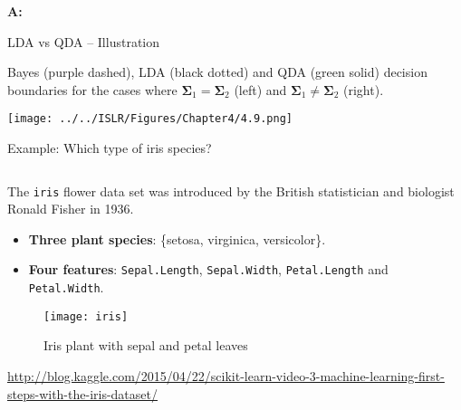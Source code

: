 \documentclass[10pt,ignorenonframetext,]{beamer}
\providecommand{\tightlist}{%
  \setlength{\itemsep}{0pt}\setlength{\parskip}{0pt}}
\begin{document}
\begin{frame}

\textbf{A:}

\vspace{50mm}

\end{frame}

\begin{frame}

\begin{block}{LDA vs QDA -- Illustration}

\vspace{1mm}

Bayes (purple dashed), LDA (black dotted) and QDA (green solid) decision
boundaries for the cases where
\(\boldsymbol{\Sigma}_1 = \boldsymbol{\Sigma}_2\) (left) and
\(\boldsymbol{\Sigma}_1 \neq \boldsymbol{\Sigma}_2\) (right).

\centering

\texttt{[image: ../../ISLR/Figures/Chapter4/4.9.png]}

\end{block}

\end{frame}

\begin{frame}[fragile]

\begin{block}{Example: Which type of iris species?}

\(~\)

The \texttt{iris} flower data set was introduced by the British
statistician and biologist Ronald Fisher in 1936.

\vspace{2mm}

\begin{itemize}
\tightlist
\item
  \textbf{Three plant species}: \{setosa, virginica, versicolor\}.
\item
  \textbf{Four features}: \texttt{Sepal.Length}, \texttt{Sepal.Width},
  \texttt{Petal.Length} and \texttt{Petal.Width}.
\end{itemize}

\begin{figure}
\texttt{[image: iris]} \caption{Iris plant with sepal and petal leaves}\label{fig:iris_pic}
\end{figure}
\vspace{-2mm}
\tiny

\url{http://blog.kaggle.com/2015/04/22/scikit-learn-video-3-machine-learning-first-steps-with-the-iris-dataset/}

\end{block}

\end{frame}
\end{document}
